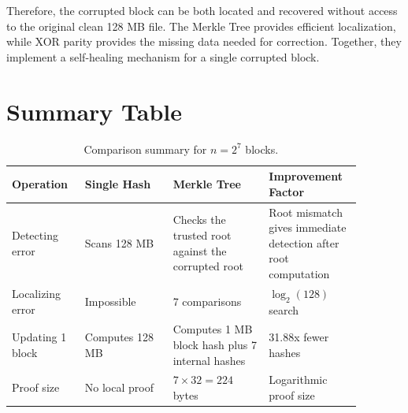 \documentclass[11pt,a4paper]{article}
\begin{document}
Therefore, the corrupted block can be both located and recovered without access
to the original clean 128 MB file. The Merkle Tree provides efficient
localization, while XOR parity provides the missing data needed for correction.
Together, they implement a self-healing mechanism for a single corrupted block.

\section{Summary Table}

\begin{table}[H]
\centering
\small
\begin{tabular}{p{0.18\linewidth}p{0.23\linewidth}p{0.25\linewidth}p{0.22\linewidth}}
\toprule
Operation & Single Hash & Merkle Tree & Improvement Factor \\
\midrule
Detecting error & Scans 128 MB & Checks the trusted root against the corrupted root & Root mismatch gives immediate detection after root computation \\
Localizing error & Impossible & 7 comparisons & $\log_2(128)$ search \\
Updating 1 block & Computes 128 MB & Computes 1 MB block hash plus 7 internal hashes & 31.88x fewer hashes \\
Proof size & No local proof & $7 \times 32 = 224$ bytes & Logarithmic proof size \\
\bottomrule
\end{tabular}
\caption{Comparison summary for $n = 2^7$ blocks.}
\end{table}
\end{document}
